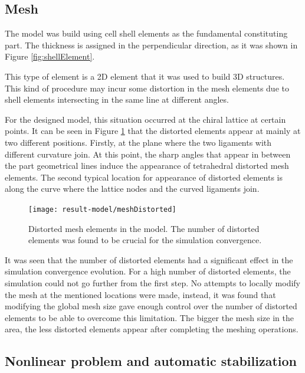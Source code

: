   \subsection{Mesh} \label{subsec:mesh_results_model}

    The model was build using cell shell elements as the fundamental constituting part. The thickness is assigned in the perpendicular direction, as it was shown in Figure \ref{fig:shellElement}.

    This type of element is a 2D element that it was used to build 3D structures. This kind of procedure may incur some distortion in the mesh elements due to shell elements intersecting in the same line at different angles.

    For the designed model, this situation occurred at the chiral lattice at certain points. It can be seen in Figure \ref{fig:meshDistorted} that the distorted elements appear at mainly at two different positions. Firstly, at the plane where the two ligaments with different curvature join. At this point, the sharp angles that appear in between the part geometrical lines induce the appearance of tetrahedral distorted mesh elements. The second typical location for appearance of distorted elements is along the curve where the lattice nodes and the curved ligaments join.

    \begin{figure}[!htpb]
      \centering
      \texttt{[image: result-model/meshDistorted]}
      \caption[Distorted mesh elements in the model]{Distorted mesh elements in the model. The number of distorted elements was found to be crucial for the simulation convergence.}\label{fig:meshDistorted}
    \end{figure}

    It was seen that the number of distorted elements had a significant effect in the simulation convergence evolution. For a high number of distorted elements, the simulation could not go further from the first step. No attempts to locally modify the mesh at the mentioned locations were made, instead, it was found that modifying the global mesh size gave enough control over the number of distorted elements to be able to overcome this limitation. The bigger the mesh size in the area, the less distorted elements appear after completing the meshing operations.

  \clearpage
  \subsection{Nonlinear problem and automatic stabilization} \label{subsec:nonlinear_results_model} %

